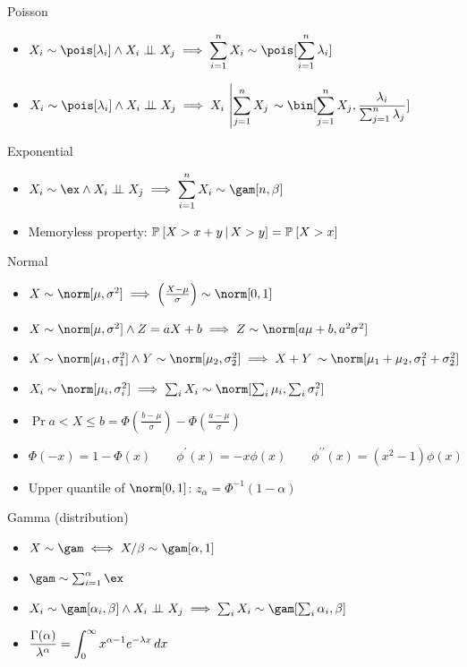 \documentclass[landscape]{article}
\begin{document}
\begin{multicols*}{2}
Poisson
\begin{itemize}
  \item $X_i\dist\pois[\lambda_i] \wedge X_i \ind X_j 
    \imp \displaystyle\sumin X_i \dist \pois[\displaystyle\sumin \lambda_i]$
  \item $X_i\dist\pois[\lambda_i] \wedge X_i \ind X_j
    \imp X_i\,\left|\displaystyle\sumjn X_j\right. \dist 
   \bin[\displaystyle\sumjn X_j,\displaystyle\frac{\lambda_i}{\sumjn\lambda_j}]$
\end{itemize}

Exponential
\begin{itemize}
  \item $X_i\dist\ex \wedge  X_i \ind X_j
    \imp \displaystyle\sumin X_i\dist \gam[n,\beta]$
  \item Memoryless property: $\mathbb{P}_{}\left[X>x+y\,|\, X>y\right]=\mathbb{P}_{}\left[X>x\right]$
\end{itemize}


Normal
\begin{itemize}
  \item $X\dist \norm[\mu,\sigma^2]
    \imp \left(\frac{X-\mu}{\sigma}\right)\dist\norm[0,1] $
  \item $X\dist \norm[\mu,\sigma^2] \wedge Z = aX+b
    \imp Z\dist\norm[a\mu+b,a^2\sigma^2] $
  \item $X\dist \norm[\mu_1,\sigma_1^2] \wedge Y\dist\norm[\mu_2,\sigma_2^2]
    \imp X+Y\,\dist \norm[\mu_1+\mu_2,\sigma_1^2 + \sigma_2^2] $
  \item $X_i\dist\norm[\mu_i,\sigma_i^2]
     \imp \sum_i X_i \dist \norm[\sum_i\mu_i,\sum_i\sigma_i^2]$
   \item $\Pr{a < X \le b}= \Phi\left(\frac{b-\mu}{\sigma}\right)
     - \Phi\left(\frac{a-\mu}{\sigma}\right) $
  \item $\Phi(-x) = 1 - \Phi(x) \qquad \phi^\prime(x) = -x\phi(x) \qquad
    \phi^{\prime\prime}(x) = (x^2-1)\phi(x)$
  \item Upper quantile of $\norm[0,1]$: $z_{\alpha} = \Phi^{-1}(1-\alpha)$
\end{itemize}

Gamma (distribution)
\begin{itemize}
  \item $X\dist\gam \eqv X/\beta \dist\gam[\alpha,1]$
  \item $\gam\dist \sum_{i=1}^\alpha\ex$
  \item $X_i\dist\gam[\alpha_i,\beta] \wedge X_i \ind X_j \imp
    \sum_i X_i\dist \gam[\sum_i \alpha_i,\beta]$
  \item $\displaystyle\frac{\Gamma(\alpha)}{\lambda^\alpha} 
    = \displaystyle\int_0^\infty x^{\alpha-1} e^{-\lambda x} \,dx$
\end{itemize}


\end{multicols*}
\end{document}
